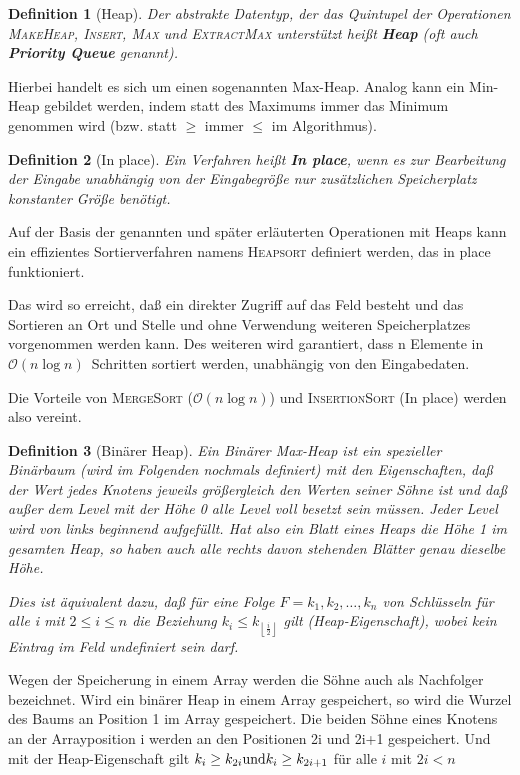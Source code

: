 \documentclass[ngerman,draft,parskip=half*,twoside]{scrreprt}
\theoremstyle{break}
\newtheorem{definition}{Definition}[chapter]
\theoremstyle{nonumberbreak}
\newcommand*{\OO}{\mathcal{O}}      %
\begin{document}
\begin{definition}[Heap]
Der abstrakte Datentyp, der das Quintupel der Operationen
\textsc{MakeHeap}, \textsc{Insert}, \textsc{Max} und \textsc{ExtractMax} unterstützt heißt \textbf{Heap} (oft auch \textbf{Priority Queue} genannt).
 \end{definition}

Hierbei handelt es sich um einen sogenannten Max-Heap. Analog kann ein Min-Heap gebildet werden, indem statt des Maximums immer das
Minimum genommen wird (bzw. statt $\geq$ immer $\leq$ im Algorithmus). 
% 
%
\begin{definition}[In place]
Ein Verfahren heißt \textbf{In place}, wenn es zur Bearbeitung der Eingabe unabhängig von der Eingabegröße nur zusätzlichen
Speicherplatz konstanter Größe benötigt.
\end{definition}

Auf der Basis der genannten und später erläuterten Operationen mit Heaps kann ein effizientes Sortierverfahren namens
\textsc{Heapsort} definiert werden, das in place funktioniert.

Das wird so erreicht, daß ein direkter Zugriff auf das Feld besteht und das Sortieren an Ort und Stelle und ohne Verwendung weiteren
Speicherplatzes vorgenommen werden kann. Des weiteren wird garantiert, dass n Elemente in $\OO(n \log n)$~Schritten sortiert werden,
unabhängig von den Eingabedaten.

Die Vorteile von \textsc{MergeSort} ($\OO(n \log n)$) und \textsc{InsertionSort} (In place) werden also vereint.

\begin{definition}[Binärer Heap]
Ein \textit{Binärer Max-Heap} ist ein spezieller Binärbaum (wird im Folgenden nochmals definiert) mit den Eigenschaften, daß der
Wert jedes Knotens jeweils größergleich den Werten seiner Söhne ist und daß außer dem Level mit der Höhe 0 alle Level voll besetzt
sein müssen. Jeder Level wird von links beginnend aufgefüllt. Hat also ein Blatt eines Heaps die Höhe 1 im gesamten Heap, so haben
auch alle rechts davon stehenden Blätter genau dieselbe Höhe.

Dies ist äquivalent dazu, daß für eine Folge $F=k_{1}, k_{2}, \ldots, k_{n}$ von Schlüsseln 
für alle i mit $2\leq i\leq n$ die Beziehung $k_{i}\leq k_{\left\lfloor \frac{i}{2}\right\rfloor}$ gilt (Heap-Eigenschaft), wobei kein
Eintrag im Feld undefiniert sein darf.
\end{definition}

Wegen der Speicherung in einem Array werden die Söhne auch als Nachfolger bezeichnet.
Wird ein binärer Heap in einem Array gespeichert, so wird die Wurzel des Baums an Position 1 im Array gespeichert. Die beiden
Söhne eines Knotens an der Arrayposition i werden an den Positionen 2i und 2i+1 gespeichert.
Und mit der Heap-Eigenschaft gilt $k_{i}\geq k_{2i} \textup{und}  k_{i}\geq k_{2i+1}$ für alle $i$ mit $2i<n$  
\end{document}
